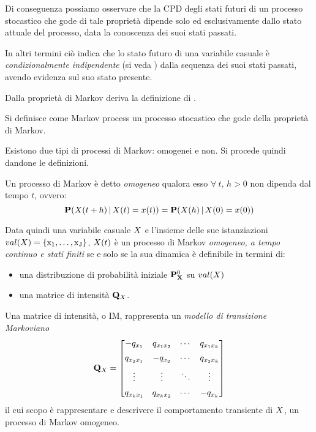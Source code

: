 Di conseguenza possiamo osservare che la \acl{CPD} degli stati futuri di un processo stocastico che gode di tale proprietà dipende solo ed esclusivamente dallo stato attuale del processo, data la conoscenza dei suoi stati passati.

In altri termini ciò indica che lo stato futuro di una variabile casuale è \emph{condizionalmente indipendente} (si veda ) dalla sequenza dei suoi stati passati, avendo evidenza sul suo stato presente.

Dalla proprietà di Markov deriva la definizione di \mprocess{}.

\begin{definizione}[\mprocess{}]
Si definisce come Markov process un processo stocastico che gode della proprietà di Markov.
\end{definizione}

Esistono due tipi di processi di Markov: omogenei e non. Si procede quindi dandone le definizioni.

\begin{definizione}[\mprocess{} \omog]
\label{defn:homogeneus-markov-process}
Un processo di Markov è detto \emph{omogeneo} qualora esso $\forall\:t,\,h > 0$ non dipenda dal tempo $t$, ovvero:
\begin{equation}
\label{eq:homogeneus-markov-process}
\mathbf{P}(\mathnormal{X}(t + h)\,\arrowvert\,\mathnormal{X}(t)=x(t))=\mathbf{P}(\mathnormal{X}(h)\,\arrowvert\,\mathnormal{X}(0)=x(0))
\end{equation}
\end{definizione}
Data quindi una variabile casuale $\mathnormal{X}$ e l'insieme delle sue istanziazioni $val(\mathnormal{X})=\{ \mathrm{x_1}, \dotsc, \mathrm{x_J} \}$, $\mathnormal{X}(t)$ è un processo di Markov \emph{omogeneo, a tempo continuo e stati finiti} se e solo se la sua dinamica è definibile in termini di:
\begin{itemize}
    \item una distribuzione di probabilità iniziale $\mathbf{P}^0_{\mathbf{X}}$ su $val(\mathnormal{X})$
    \item una matrice di intensità $\mathbf{Q}_{\mathnormal{X}}$.
\end{itemize}

\begin{definizione}
\label{defn:im}
Una matrice di intensità, o \acf{IM}, rappresenta un \emph{modello di transizione Markoviano}
\[
\mathbf{Q}_{\mathnormal{X}}= \begin{bmatrix}
                        -q_{x_1}    & q_{x_1x_2}& \cdots & q_{x_1x_k}   \\[0.5em]
                        q_{x_2x_1}  & -q_{x_2}  & \cdots & q_{x_2x_k}   \\[0.5em]
                        \vdots      & \vdots    & \ddots & \vdots       \\[0.5em]
                        q_{x_kx_1}  & q_{x_kx_2}& \cdots & -q_{x_k}
                    \end{bmatrix}
\]
il cui scopo è rappresentare e descrivere il comportamento transiente di $\mathnormal{X}$, un processo di Markov omogeneo.
\end{definizione}


